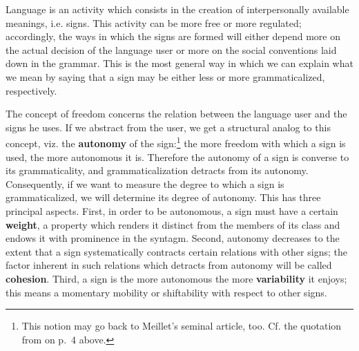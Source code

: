 Language is an activity which consists in the creation of interpersonally available meanings, i.e. signs. This activity can be more free or more regulated; accordingly, the ways in which the signs are formed will either depend more on the actual decision of the language user or more on the social conventions laid down in the grammar. This is the most general way in which we can explain what we mean by saying that a sign may be either less or more grammaticalized, respectively.

The concept of freedom concerns the relation between the language user and the signs he uses. If we abstract from the user, we get a structural analog to this concept, viz. the \textbf{autonomy} of the sign:\footnote{This notion may go back to Meillet's seminal article, too. Cf. the quotation from \citet[131 ]{Meillet1912} on p.~4 above.} the more freedom with which a sign is used, the more autonomous it is. Therefore the autonomy of a sign is converse to its grammaticality, and grammaticalization detracts from its autonomy. Consequently, if we want to measure the degree to which a sign is grammaticalized, we will determine its degree of autonomy. This has three principal aspects. First, in order to be autonomous, a sign must have a certain \textbf{weight}, a property which renders it distinct from the members of its class and endows it with prominence in the syntagm. Second, autonomy decreases to the extent that a sign systematically contracts certain relations with other signs; the factor inherent in such relations which detracts from autonomy will be called \textbf{cohesion}. Third, a sign is the more autonomous the more \textbf{variability} it enjoys; this means a momentary mobility or shiftability with respect to other signs.

